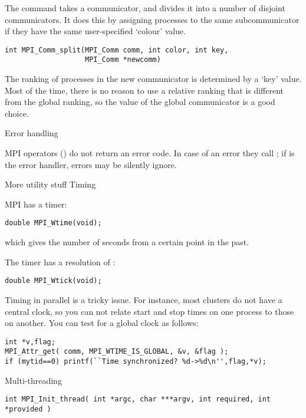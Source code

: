 The command  takes a communicator, and
divides it into a number of disjoint communicators. It does this by
assigning processes to the same subcommunicator if they have the same
user-specified `colour' value.
\begin{verbatim}
int MPI_Comm_split(MPI_Comm comm, int color, int key, 
                   MPI_Comm *newcomm)
\end{verbatim}
The ranking of processes in the new communicator is determined by a `key' value.
Most of the time, there is no reason to use a relative ranking that is different from
the global ranking, so the  value of the global communicator
is a good choice.

 {Error handling}

MPI operators () do not return an error code. In case of
an error they call ; if 
is the error handler, errors may be silently ignore.

 {More utility stuff}
 {Timing}

MPI has a  timer: 
\begin{verbatim}
double MPI_Wtime(void);
\end{verbatim}
which gives the number of seconds from a certain point in the past.

The timer has a resolution of :
\begin{verbatim}
double MPI_Wtick(void);
\end{verbatim}

Timing in parallel is a tricky issue. For instance, most clusters do
not have a central clock, so you can not relate start and stop times
on one process to those on another. You can test for a global clock as
follows:
\begin{verbatim}
int *v,flag;
MPI_Attr_get( comm, MPI_WTIME_IS_GLOBAL, &v, &flag );
if (mytid==0) printf(``Time synchronized? %d->%d\n'',flag,*v);
\end{verbatim}


 {Multi-threading}

\begin{verbatim}
int MPI_Init_thread( int *argc, char ***argv, int required, int *provided )
\end{verbatim}

